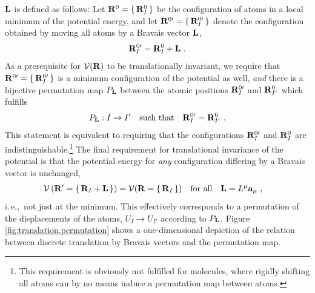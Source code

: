 $\bf L$ is defined as follows:
Let ${\bf R}^0 = \set{{\bf R}_I^0}$ be the configuration of atoms in a local minimum of the potential energy, and let ${\bf R}^{0 \prime} = \set{{\bf R}^{0 \prime}_{I}}$ denote the configuration obtained by moving all atoms by a Bravais vector ${\bf L}$,
\begin{align}
	{\bf R}^{0 \prime}_{I} = {\bf R}^0_{I} + {\bf L}~.
	\label{eq:RI'}
\end{align}
As a prerequisite for $\mathcal V ({\bf R})$ to be translationally invariant, we require that ${\bf R}^{0 \prime} = \set{{\bf R}^{0 \prime}_{I}}$ is a minimum configuration of the potential as well, \emph{and} there is a bijective permutation map $P_{\bf L}$ between the atomic positions ${\bf R}^{0 \prime}_{I}$ and ${\bf R}^{0}_{I'}$ which fulfills
\begin{align}
	P_{\bf L} : I \to I' \quad\text{such that}\quad
	{\bf R}^{0 \prime}_{I}
		= {\bf R}^{0}_{I'}~.
	\label{eq:translation.permutation}
\end{align}
This statement is equivalent to requiring that the configurations ${\bf R}^{0 \prime}_{I}$ and ${\bf R}^{0}_{I}$ are indistinguishable.\footnote{This requirement is obviously not fulfilled for molecules, where rigidly shifting all atoms can by no means induce a permutation map between atoms.} 
The final requirement for translational invariance of the potential is that the potential energy for \emph{any} configuration differing by a Bravais vector is unchanged,
\begin{align}
	\mathcal{V} \left( {\bf R}' = \set{{\bf R}_{I} + {\bf L}} \right)
	&= \mathcal{V}({\bf R} = \set{{\bf R}_{I}} ) 
	\quad\text{for all}\quad {\bf L} = L^\mu {\bf a}_\mu~,
	\label{eq:inv.V}
\end{align}
i.\,e.,~not just at the minimum. This effectively corresponds to a permutation of the displacements of the atoms, $U_I \to U_{I'}$ according to $P_{\bf L}$. Figure\,\ref{fig:translation.permutation} shows a one-dimensional depiction of the relation between discrete translation by Bravais vectors and the permutation map.
